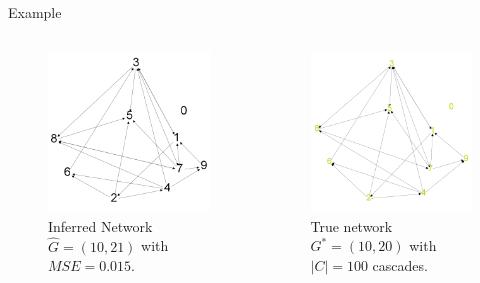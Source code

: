 \documentclass{beamer}
\begin{document}
\begin{frame}{Example}
\begin{columns}
\begin{figure}
    \centering
    \includegraphics[scale = 0.1]{G_star.png}
    \caption{Inferred Network $\hat{G} = (10,21)$ with $MSE = 0.015$.}
\end{figure}
\begin{figure}
    \centering
    \includegraphics[scale = 0.1]{G-true2.png}
    \caption{True network $G^* = (10,20)$ with $|C| = 100$ cascades.}
\end{figure}
\end{columns}
\end{frame}
\end{document}
